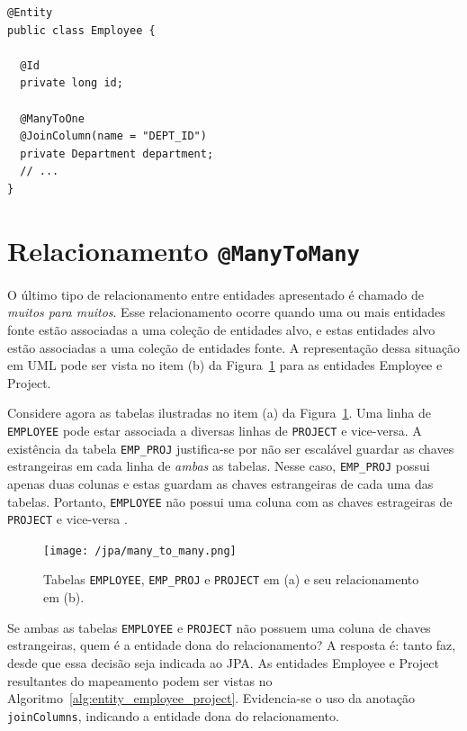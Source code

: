 \documentclass[
  10.5pt,				  %
	openright,			%
	twoside,			  %
  a5paper,
  chapter=TITLE,	%
	section=TITLE,	%
  hyphens,        %
	english,        %
	brazil          %
]{abntex2}
\begin{document}
\begin{lstlisting}[caption={Classe Employee e seus relacionamentos.}, label={alg:entity_employee2}]
@Entity
public class Employee {

  @Id
  private long id;

  @ManyToOne
  @JoinColumn(name = "DEPT_ID")
  private Department department;
  // ...
}
\end{lstlisting}
%


\section{Relacionamento \texttt{@ManyToMany}}

O último tipo de relacionamento entre entidades apresentado é chamado de \emph{muitos para muitos}. Esse relacionamento ocorre quando uma ou mais entidades fonte estão associadas a uma coleção de entidades alvo, e estas entidades alvo estão associadas a uma coleção de entidades fonte. A representação dessa situação em UML pode ser vista no item (b) da Figura~\ref{fig:jpa_manytomany} para as entidades Employee e Project.

Considere agora as tabelas ilustradas no item (a) da Figura~\ref{fig:jpa_manytomany}. Uma linha de \texttt{EMPLOYEE} pode estar associada a diversas linhas de \texttt{PROJECT} e vice-versa. A existência da tabela \texttt{EMP\_PROJ} justifica-se por não ser escalável guardar as chaves estrangeiras em cada linha de \emph{ambas} as tabelas. Nesse caso, \texttt{EMP\_PROJ} possui apenas duas colunas e estas guardam as chaves estrangeiras de cada uma das tabelas. Portanto, \texttt{EMPLOYEE} não possui uma coluna com as chaves estrageiras de \texttt{PROJECT} e vice-versa \cite{keith2013}.

\begin{figure}[!ht]
  \caption{\label{fig:jpa_manytomany} Tabelas \texttt{EMPLOYEE},  \texttt{EMP\_PROJ} e \texttt{PROJECT} em (a) e seu relacionamento em (b).}
  \begin{center}
    \texttt{[image: /jpa/many\_to\_many.png]}
  \end{center}
\end{figure}

Se ambas as tabelas \texttt{EMPLOYEE} e \texttt{PROJECT} não possuem uma coluna de chaves estrangeiras, quem é a entidade dona do relacionamento? A resposta é: tanto faz, desde que essa decisão seja indicada ao JPA. As entidades Employee e Project resultantes do mapeamento podem ser vistas no Algoritmo~\ref{alg:entity_employee_project}. Evidencia-se o uso da anotação \texttt{joinColumns}, indicando a entidade dona do relacionamento.
\end{document}
